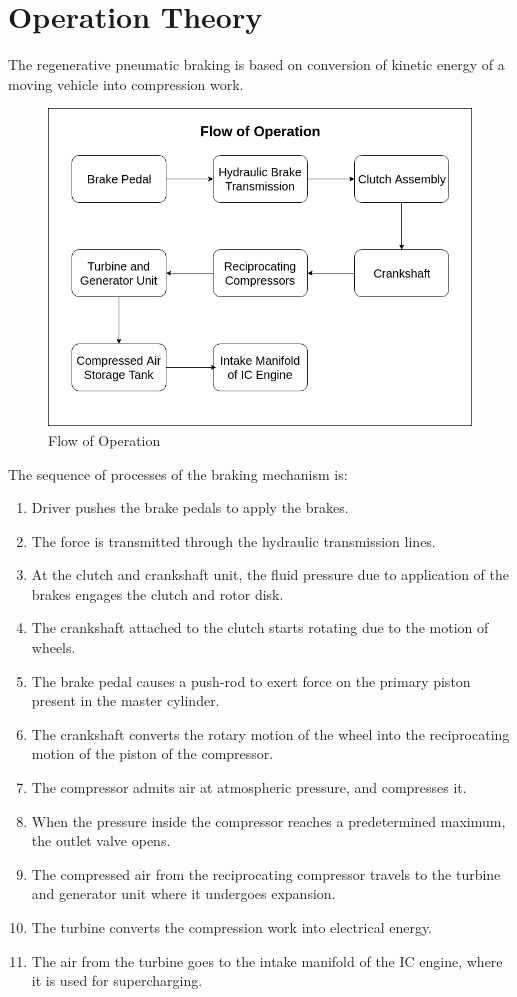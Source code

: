 \documentclass[12pt,a4paper]{article}
\begin{document}
\section{Operation Theory}
	The regenerative pneumatic braking is based on conversion of kinetic energy of a moving vehicle into compression work.

	\begin{figure}[H]
		\centering
		\includegraphics[width=1\textwidth]{images/flow-of-operation.png}
		\caption{Flow of Operation}
		\label{fig:flow_of_operation}
	\end{figure}

	The sequence of processes of the braking mechanism is:

	\begin{enumerate}
		\item Driver pushes the brake pedals to apply the brakes.
		\item The force is transmitted through the hydraulic transmission lines.
		\item At the clutch and crankshaft unit, the fluid pressure due to application of the brakes engages the clutch and rotor disk.
		\item The crankshaft attached to the clutch starts rotating due to the motion of wheels.
		\item The brake pedal causes a push-rod to exert force on the primary piston present in the master cylinder.
		\item The crankshaft converts the rotary motion of the wheel into the reciprocating motion of the piston of the compressor.
		\item The compressor admits air at atmospheric pressure, and compresses it.
		\item When the pressure inside the compressor reaches a predetermined maximum, the outlet valve opens.
		\item The compressed air from the reciprocating compressor travels to the turbine and generator unit where it undergoes expansion.
		\item The turbine converts the compression work into electrical energy.
		\item The air from the turbine goes to the intake manifold of the IC engine, where it is used for supercharging.
	\end{enumerate}
\end{document}

